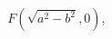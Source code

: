 \documentclass[preview]{standalone}
\begin{document}
\begin{align*}
F(\sqrt{a^2-b^2}, 0),
\end{align*}
\end{document}

